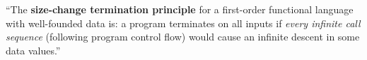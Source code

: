 \begin{frame}


\begin{center}

``The {\bf size-change termination principle} for a first-order functional
language with well-founded data is: a program terminates on all inputs if
\emph{every infinite call sequence} (following program control flow) would
cause an infinite descent in some data values.''

\end{center}

\begin{flushright}
\cite{size-change}
\end{flushright}

\end{frame}
